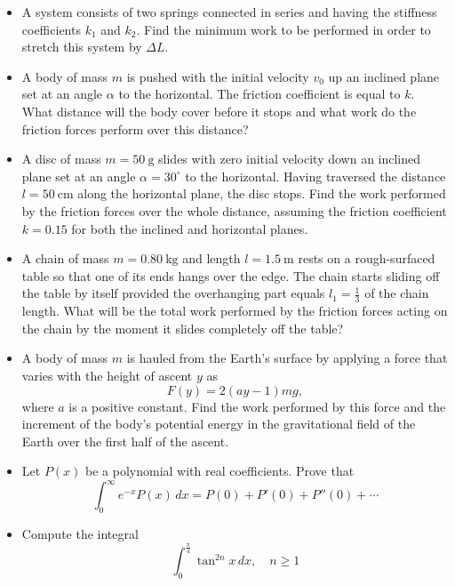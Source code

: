 \documentclass[12pt]{article}
\begin{document}
\begin{itemize}
    \item A system consists of two springs connected in series and
    having the stiffness coefficients $k_1$ and $k_2$. Find the minimum work
    to be performed in order to stretch this system by $\Delta L$.
    \item A body of mass $m$ is pushed with the initial velocity $v_0$
    up an inclined plane set at an angle $\alpha$ to the horizontal. The friction
    coefficient is equal to $k$. What distance will the body cover before it
    stops and what work do the friction forces perform over this distance?
    \item A disc of mass $m=50\ \mathrm{g}$ slides with zero initial velocity down an inclined plane set at an angle $\alpha=30^\circ$ to the horizontal. Having traversed the distance $l=50\ \mathrm{cm}$ along the horizontal plane, the disc stops. Find the work performed by the friction forces over the whole distance, assuming the friction coefficient $k=0.15$ for both the inclined and horizontal planes.
    \item A chain of mass $m=0.80\ \mathrm{kg}$ and length $l=1.5\ \mathrm{m}$ rests on a rough-surfaced table so that one of its ends hangs over the edge. The chain starts sliding off the table by itself provided the overhanging part equals $l_1=\tfrac{1}{3}$ of the chain length. What will be the total work performed by the friction forces acting on the chain by the moment it slides completely off the table?

    \item A body of mass $m$ is hauled from the Earth's surface by applying a force that varies with the height of ascent $y$ as 
    \[
        F(y) = 2(ay - 1)mg,
    \]
    where $a$ is a positive constant. Find the work performed by this force and the increment of the body's potential energy in the gravitational field of the Earth over the first half of the ascent.
        
    \item[\quad \textbf{a.}] Let $P(x)$ be a polynomial with real coefficients. Prove that
    \[\int_{0}^{\infty} e^{-x}P(x) \, dx=P(0)+P'(0)+P''(0)+\cdots \]
    
    \item[\quad \textbf{b.}] Compute the integral
    \[
   \int_{0}^{\frac{\pi}{4}} \tan^{2n}x \, dx, \quad n\ge1
    \]
\end{itemize}

\vspace{5mm}

\end{document}
